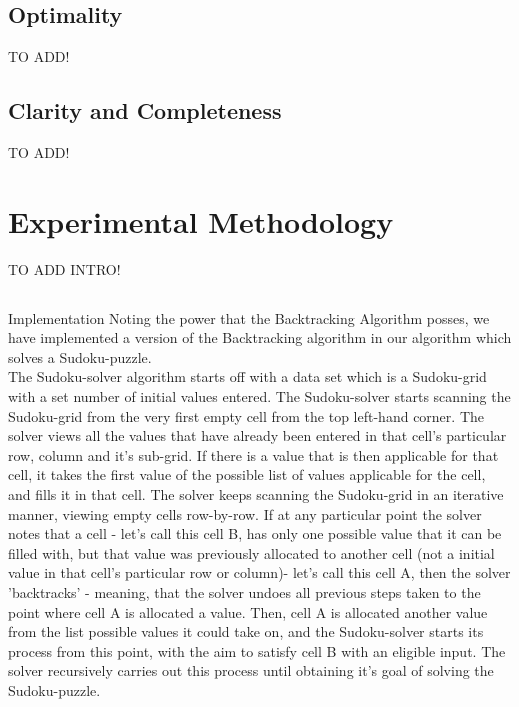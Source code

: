 \documentclass[12pt]{article}
\begin{document}
\subsection{Optimality}
\begin{flushleft}
TO ADD!
\end{flushleft}

\subsection{Clarity and Completeness}
\begin{flushleft}
TO ADD!
\end{flushleft}

\section{Experimental Methodology}
TO ADD INTRO!
\subsection{}{Implementation}
Noting the power that the Backtracking Algorithm posses, we have implemented a version of the Backtracking algorithm in our algorithm which solves a Sudoku-puzzle.\\
The Sudoku-solver algorithm starts off with a data set which is a Sudoku-grid with a set number of initial values entered.%
The Sudoku-solver starts scanning the Sudoku-grid from the very first empty cell from the top left-hand corner. The solver views all the values that have already been entered in that cell's particular row, column and it's sub-grid. If there is a value that is then applicable for that cell, it takes the first value of the possible list of values applicable for the cell, and fills it in that cell. The solver keeps scanning the Sudoku-grid in an iterative manner, viewing empty cells row-by-row. If at any particular point the solver notes that a cell - let's call this cell B,  has only one possible value that it can be filled with, but that value was previously allocated to another cell %
(not a initial value in that cell's particular row or column)- let's call this cell A, then the solver 'backtracks' - meaning, that the solver undoes all previous steps taken to the point where cell A is allocated a value. Then, cell A is allocated another value from the list possible values it could take on, and the Sudoku-solver starts its process from this point, with the aim to satisfy cell B with an eligible input. The solver recursively carries out this process until obtaining it's goal of solving the Sudoku-puzzle.  
\end{document}
